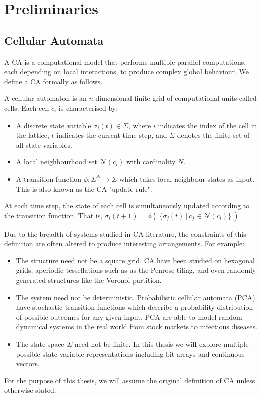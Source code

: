 \chapter{Preliminaries} \label{preliminaries}

\section{Cellular Automata}

A CA is a computational model that performs multiple parallel computations, each depending on local interactions, to produce complex global behaviour. We define a CA formally as follows.

\begin{definition}
A cellular automaton is an $n$-dimensional finite grid of computational units called cells. Each cell $c_i$ is characterised by:
\begin{itemize}
  \item A discrete state variable $\sigma_i(t) \in \Sigma$, where $i$ indicates the index of the cell in the lattice, $t$ indicates the current time step, and $\Sigma$ denotes the finite set of all state variables.
  \item A local neighbourhood set $\mathcal{N}(c_i)$ with cardinality $N$. 
  \item A transition function $\phi:\Sigma^N \to \Sigma$ which takes local neighbour states as input. This is also known as the CA "update rule".
\end{itemize}

At each time step, the state of each cell is simultaneously updated according to the transition function. That is, $\sigma_i(t+1) = \phi( \:\{ \sigma_j(t) \: | \: c_j \in \mathcal{N}(c_i) \} \:)$
\end{definition}

Due to the breadth of systems studied in CA literature, the constraints of this definition are often altered to produce interesting arrangements. For example:
\begin{itemize}
  \item The structure need not be a square grid. CA have been studied on hexagonal grids\cite{encinas2007modelling}, aperiodic tessellations such as as the Penrose tiling\cite{goucher2012gliders}, and even randomly generated structures like the Voronoi partition\cite{shi2000development}.
  \item The system need not be deterministic. Probabilistic cellular automata (PCA) have stochastic transition functions which describe a probability distribution of possible outcomes for any given input. PCA are able to model random dynamical systems in the real world from stock markets\cite{bartolozzi2004stochastic} to infectious diseases\cite{mikler2005modeling}.
  \item The state space $\Sigma$ need not be finite. In this thesis we will explore multiple possible state variable representations including bit arrays and continuous vectors.
\end{itemize}
For the purpose of this thesis, we will assume the original definition of CA unless otherwise stated.\\

